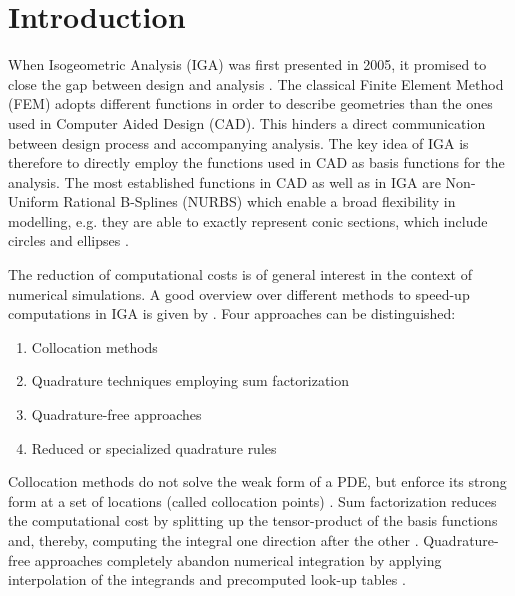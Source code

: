 \documentclass[3p]{elsarticle}
\begin{document}

\section{Introduction}
When Isogeometric Analysis (IGA) was first presented in 2005, it promised to close the gap between design and analysis \cite{Hughes2005}. The classical Finite Element Method (FEM) adopts different functions in order to describe geometries than the ones used in Computer Aided Design (CAD). This hinders a direct communication between design process and accompanying analysis. The key idea of IGA is therefore to directly employ the functions used in CAD as basis functions for the analysis. The most established functions in CAD as well as in IGA are Non-Uniform Rational B-Splines (NURBS) which enable a broad flexibility in modelling, e.g. they are able to exactly represent conic sections, which include circles and ellipses \cite{Hughes2005}. \bigskip

The reduction of computational costs is of general interest in the context of numerical simulations. A good overview over different methods to speed-up computations in IGA is given by \cite{Pan2020}. Four approaches can be distinguished: 
\begin{enumerate}
	\item Collocation methods
	\item Quadrature techniques employing sum factorization
	\item Quadrature-free approaches
	\item Reduced or specialized quadrature rules
\end{enumerate}
Collocation methods do not solve the weak form of a PDE, but enforce its strong form at a set of locations (called collocation points) \cite{Auricchio2010}. Sum factorization reduces the computational cost by splitting up the tensor-product of the basis functions and, thereby, computing the integral one direction after the other \cite{Antolin2015}. Quadrature-free approaches completely abandon numerical integration by applying interpolation of the integrands and precomputed look-up tables \cite{Pan2020}. \bigskip
\end{document}
